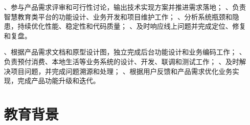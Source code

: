\documentclass[11pt]{resume}
\begin{document}
、参与产品需求评审和可行性讨论，输出技术实现方案并推进需求落地；
、负责智慧教育类平台的功能设计、业务开发和项目维护工作；
、分析系统瓶颈和隐患，持续优化性能、稳定性和代码质量；
、及时响应线上问题并完成定位、修复和复盘。

、根据产品需求文档和原型设计图，独立完成后台功能设计和业务编码工作；
、负责预付消费、本地生活等业务系统的设计、开发、联调和测试工作；
、及时解决项目问题，并完成问题溯源和处理；
、根据用户反馈和产品需求优化业务实现，完成产品功能升级和迭代。

\section{教育背景}
\end{document}
